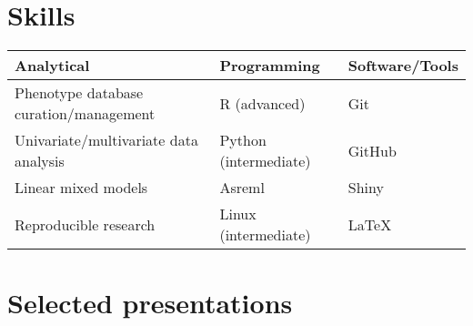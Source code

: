 \documentclass[11pt,a4paper,]{awesome-cv}
\begin{document}
\hypertarget{skills}{%
\section{Skills}\label{skills}}

\begin{table}[!h]
\centering\begingroup\fontsize{8}{10}\selectfont

\begin{tabular}{lll}
\toprule
\textbf{Analytical} & \textbf{Programming} & \textbf{Software/Tools}\\
\midrule
Phenotype database curation/management & R (advanced) & Git\\
Univariate/multivariate data analysis & Python (intermediate) & GitHub\\
Linear mixed models & Asreml & Shiny\\
Reproducible research & Linux (intermediate) & LaTeX\\
\bottomrule
\end{tabular}
\endgroup{}
\end{table}

\hypertarget{selected-presentations}{%
\section{Selected presentations}\label{selected-presentations}}
\end{document}
